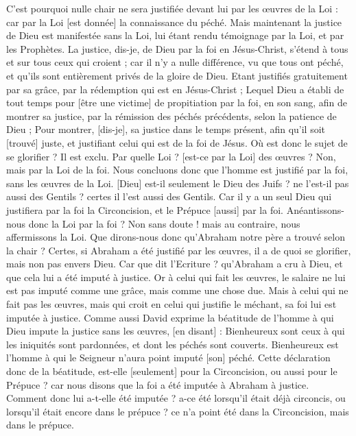 \begin{multicols}{2}
C'est pourquoi nulle chair ne sera justifiée devant lui par les œuvres de la Loi : car par la Loi [est donnée] la connaissance du péché.
Mais maintenant la justice de Dieu est manifestée sans la Loi, lui étant rendu témoignage par la Loi, et par les Prophètes.
La justice, dis-je, de Dieu par la foi en Jésus-Christ, s'étend à tous et sur tous ceux qui croient ; car il n'y a nulle différence, vu que tous ont péché, et qu'ils sont entièrement privés de la gloire de Dieu.
Etant justifiés gratuitement par sa grâce, par la rédemption qui est en Jésus-Christ ;
Lequel Dieu a établi de tout temps pour [être une victime] de propitiation par la foi, en son sang, afin de montrer sa justice, par la rémission des péchés précédents, selon la patience de Dieu ;
Pour montrer, [dis-je], sa justice dans le temps présent, afin qu'il soit [trouvé] juste, et justifiant celui qui est de la foi de Jésus.
Où est donc le sujet de se glorifier ? Il est exclu. Par quelle Loi ? [est-ce par la Loi] des œuvres ? Non, mais par la Loi de la foi.
Nous concluons donc que l'homme est justifié par la foi, sans les œuvres de la Loi.
[Dieu] est-il seulement le Dieu des Juifs ? ne l'est-il pas aussi des Gentils ? certes il l'est aussi des Gentils.
Car il y a un seul Dieu qui justifiera par la foi la Circoncision, et le Prépuce [aussi] par la foi.
Anéantissons-nous donc la Loi par la foi ? Non sans doute ! mais au contraire, nous affermissons la Loi.
\VerseOne{}Que dirons-nous donc qu'Abraham notre père a trouvé selon la chair ?
Certes, si Abraham a été justifié par les œuvres, il a de quoi se glorifier, mais non pas envers Dieu.
Car que dit l'Ecriture ? qu'Abraham a cru à Dieu, et que cela lui a été imputé à justice.
Or à celui qui fait les œuvres, le salaire ne lui est pas imputé comme une grâce, mais comme une chose due.
Mais à celui qui ne fait pas les œuvres, mais qui croit en celui qui justifie le méchant, sa foi lui est imputée à justice.
Comme aussi David exprime la béatitude de l'homme à qui Dieu impute la justice sans les œuvres, [en disant] :
Bienheureux sont ceux à qui les iniquités sont pardonnées, et dont les péchés sont couverts.
Bienheureux est l'homme à qui le Seigneur n'aura point imputé [son] péché.
Cette déclaration donc de la béatitude, est-elle [seulement] pour la Circoncision, ou aussi pour le Prépuce ? car nous disons que la foi a été imputée à Abraham à justice.
Comment donc lui a-t-elle été imputée ? a-ce été lorsqu'il était déjà circoncis, ou lorsqu'il était encore dans le prépuce ? ce n'a point été dans la Circoncision, mais dans le prépuce.

\end{multicols}
